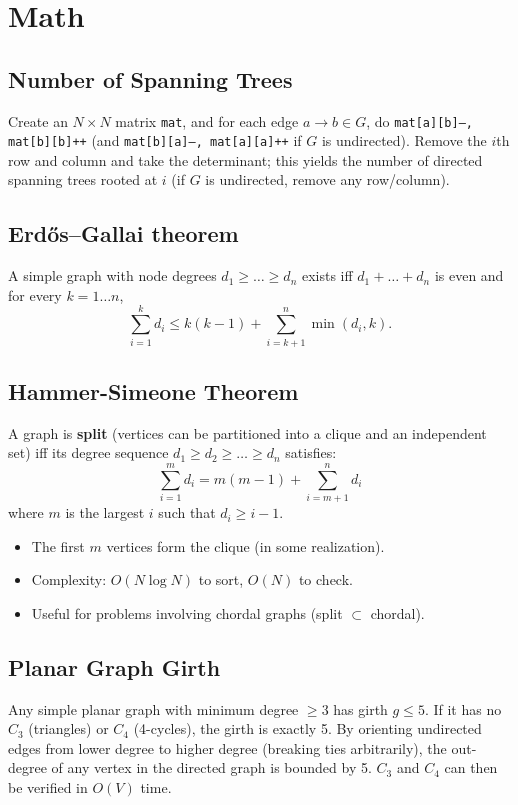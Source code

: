 \section{Math}
	\subsection{Number of Spanning Trees}
		Create an $N\times N$ matrix \texttt{mat}, and for each edge $a \rightarrow b \in G$, do
		\texttt{mat[a][b]--, mat[b][b]++} (and \texttt{mat[b][a]--, mat[a][a]++} if $G$ is undirected).
		Remove the $i$th row and column and take the determinant; this yields the number of directed spanning trees rooted at $i$
		(if $G$ is undirected, remove any row/column).

	\subsection{Erdős–Gallai theorem}
		A simple graph with node degrees $d_1 \ge \dots \ge d_n$ exists iff $d_1 + \dots + d_n$ is even and for every $k = 1\dots n$,
		\[ \sum _{i=1}^{k}d_{i}\leq k(k-1)+\sum _{i=k+1}^{n}\min(d_{i},k). \]

	\subsection{Hammer-Simeone Theorem}
		A graph is \textbf{split} (vertices can be partitioned into a clique and an independent set) iff its degree sequence $d_1 \ge d_2 \ge \dots \ge d_n$ satisfies:
		\[ \sum_{i=1}^m d_i = m(m-1) + \sum_{i=m+1}^n d_i \]
		where $m$ is the largest $i$ such that $d_i \ge i-1$.
		\begin{itemize}
			\item The first $m$ vertices form the clique (in some realization).
			\item Complexity: $O(N \log N)$ to sort, $O(N)$ to check.
			\item Useful for problems involving chordal graphs (split $\subset$ chordal).
		\end{itemize}

	\subsection{Planar Graph Girth}
		Any simple planar graph with minimum degree $\ge 3$ has girth $g \le 5$.
		If it has no $C_3$ (triangles) or $C_4$ (4-cycles), the girth is exactly 5.
		By orienting undirected edges from lower degree to higher degree (breaking ties arbitrarily), the out-degree of any vertex in the directed graph is bounded by 5.
		$C_3$ and $C_4$ can then be verified in $O(V)$ time.

